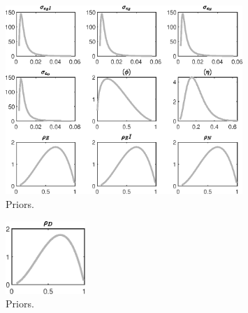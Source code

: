  
\begin{figure}[H]
\centering
\includegraphics[width=0.80\textwidth]{BRS_est_shopping/graphs/BRS_est_shopping_Priors1}
\caption{Priors.}\label{Fig:Priors:1}
\end{figure}
\begin{figure}[H]
\centering
\includegraphics[width=0.27\textwidth]{BRS_est_shopping/graphs/BRS_est_shopping_Priors2}
\caption{Priors.}\label{Fig:Priors:2}
\end{figure}
 
